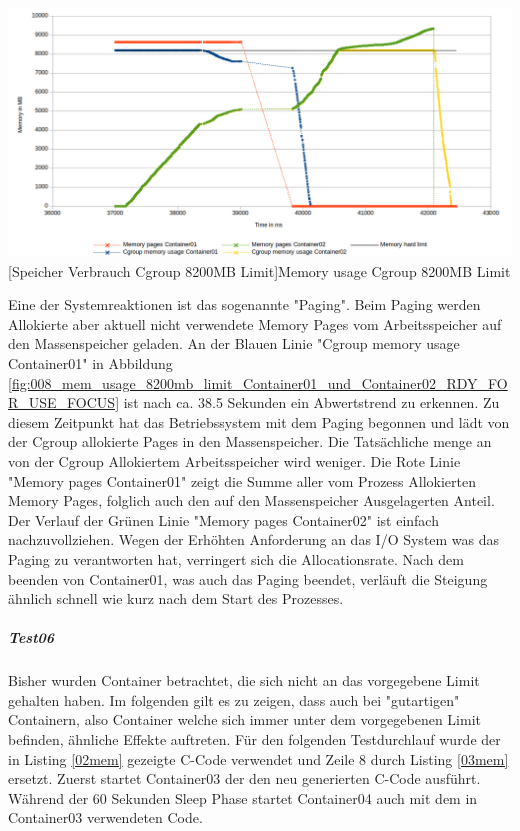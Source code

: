 \vspace{1em}
\begin{minipage}{\linewidth}
	\centering
	\includegraphics[width=1\linewidth]{pics/008_mem_usage_8200mb_limit_Container01_und_Container02_RDY_FOR_USE_FOCUS.png}
	[Speicher Verbrauch Cgroup 8200MB Limit]{Memory usage Cgroup 8200MB Limit}
	\label{fig:008_mem_usage_8200mb_limit_Container01_und_Container02_RDY_FOR_USE_FOCUS}
\end{minipage}



Eine der Systemreaktionen ist das sogenannte "Paging". Beim Paging werden Allokierte aber aktuell nicht verwendete Memory Pages vom Arbeitsspeicher auf den Massenspeicher geladen. An der Blauen Linie "Cgroup memory usage Container01" in Abbildung \ref{fig:008_mem_usage_8200mb_limit_Container01_und_Container02_RDY_FOR_USE_FOCUS} ist nach ca. 38.5 Sekunden ein Abwertstrend zu erkennen. Zu diesem Zeitpunkt hat das Betriebssystem mit dem Paging begonnen und lädt von der Cgroup allokierte Pages in den Massenspeicher. Die Tatsächliche menge an von der Cgroup Allokiertem Arbeitsspeicher wird weniger. Die Rote Linie "Memory pages Container01" zeigt die Summe aller vom Prozess Allokierten Memory Pages, folglich auch den auf den Massenspeicher Ausgelagerten Anteil. Der Verlauf der Grünen Linie "Memory pages Container02" ist einfach nachzuvollziehen. Wegen der Erhöhten Anforderung an das I/O System was das Paging zu verantworten hat, verringert sich die Allocationsrate. Nach dem beenden von Container01, was auch das Paging beendet, verläuft die Steigung ähnlich schnell wie kurz nach dem Start des Prozesses. 

\subparagraph{Test06}
Bisher wurden Container betrachtet, die sich nicht an das vorgegebene Limit gehalten haben. Im folgenden gilt es zu zeigen, dass auch bei "gutartigen" Containern, also Container welche sich immer unter dem vorgegebenen Limit befinden, ähnliche Effekte auftreten. Für den folgenden Testdurchlauf wurde der in Listing \ref{02mem} gezeigte C-Code verwendet und Zeile 8 durch Listing \ref{03mem} ersetzt. Zuerst startet Container03 der den neu generierten C-Code ausführt. Während der 60 Sekunden Sleep Phase startet Container04 auch mit dem in Container03 verwendeten Code.

